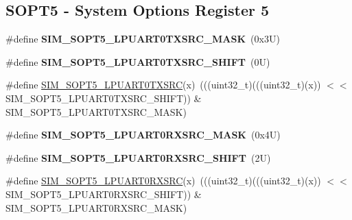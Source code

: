 \subsection*{S\+O\+P\+T5 -\/ System Options Register 5}
\begin{DoxyCompactItemize}
\item 
\mbox{\label{group___s_i_m___register___masks_ga97add49b891980bf4f6ef85baab1ffba}} 
\#define {\bfseries S\+I\+M\+\_\+\+S\+O\+P\+T5\+\_\+\+L\+P\+U\+A\+R\+T0\+T\+X\+S\+R\+C\+\_\+\+M\+A\+SK}~(0x3\+U)
\item 
\mbox{\label{group___s_i_m___register___masks_ga67ce7e4f6db781fd3a80409ceadb066d}} 
\#define {\bfseries S\+I\+M\+\_\+\+S\+O\+P\+T5\+\_\+\+L\+P\+U\+A\+R\+T0\+T\+X\+S\+R\+C\+\_\+\+S\+H\+I\+FT}~(0\+U)
\item 
\#define \mbox{\hyperlink{group___s_i_m___register___masks_ga9d428a29003502337648f46e6441ee8b}{S\+I\+M\+\_\+\+S\+O\+P\+T5\+\_\+\+L\+P\+U\+A\+R\+T0\+T\+X\+S\+RC}}(x)~(((uint32\+\_\+t)(((uint32\+\_\+t)(x)) $<$$<$ S\+I\+M\+\_\+\+S\+O\+P\+T5\+\_\+\+L\+P\+U\+A\+R\+T0\+T\+X\+S\+R\+C\+\_\+\+S\+H\+I\+FT)) \& S\+I\+M\+\_\+\+S\+O\+P\+T5\+\_\+\+L\+P\+U\+A\+R\+T0\+T\+X\+S\+R\+C\+\_\+\+M\+A\+SK)
\item 
\mbox{\label{group___s_i_m___register___masks_gaf40a5947847659e369997e8c080cefba}} 
\#define {\bfseries S\+I\+M\+\_\+\+S\+O\+P\+T5\+\_\+\+L\+P\+U\+A\+R\+T0\+R\+X\+S\+R\+C\+\_\+\+M\+A\+SK}~(0x4\+U)
\item 
\mbox{\label{group___s_i_m___register___masks_gab8a6afc643c5374f4545a3f6a2967765}} 
\#define {\bfseries S\+I\+M\+\_\+\+S\+O\+P\+T5\+\_\+\+L\+P\+U\+A\+R\+T0\+R\+X\+S\+R\+C\+\_\+\+S\+H\+I\+FT}~(2\+U)
\item 
\#define \mbox{\hyperlink{group___s_i_m___register___masks_ga35cb2dd7d6581ce558c0acd4a35f99b3}{S\+I\+M\+\_\+\+S\+O\+P\+T5\+\_\+\+L\+P\+U\+A\+R\+T0\+R\+X\+S\+RC}}(x)~(((uint32\+\_\+t)(((uint32\+\_\+t)(x)) $<$$<$ S\+I\+M\+\_\+\+S\+O\+P\+T5\+\_\+\+L\+P\+U\+A\+R\+T0\+R\+X\+S\+R\+C\+\_\+\+S\+H\+I\+FT)) \& S\+I\+M\+\_\+\+S\+O\+P\+T5\+\_\+\+L\+P\+U\+A\+R\+T0\+R\+X\+S\+R\+C\+\_\+\+M\+A\+SK)
\item 
\mbox{\label{group___s_i_m___register___masks_ga901df3fb7d916f79d2eeb60775f71800}} 

\end{DoxyCompactItemize}
